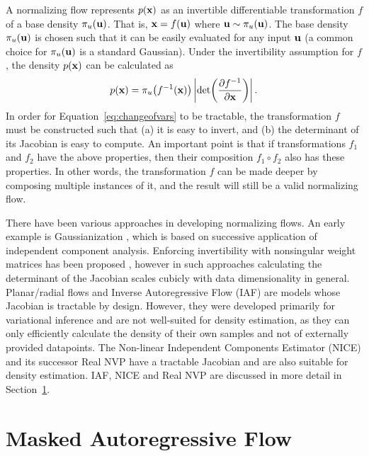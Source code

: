 A normalizing flow \citep{Rezende:2015} represents $p\mathopen{}\left(\mathbf{x}\right)\mathclose{}$ as an invertible differentiable transformation $f$ of a base density $\pi_u\mathopen{}\left(\mathbf{u}\right)\mathclose{}$. That is, 
$\mathbf{x} = f\mathopen{}\left(\mathbf{u}\right)\mathclose{}$ where $\mathbf{u}\sim\pi_u\mathopen{}\left(\mathbf{u}\right)\mathclose{}$.
The base density $\pi_u\mathopen{}\left(\mathbf{u}\right)\mathclose{}$ is chosen such that it can be easily evaluated for any input $\mathbf{u}$ (a common choice for $\pi_u\mathopen{}\left(\mathbf{u}\right)\mathclose{}$ is a standard Gaussian). Under the invertibility assumption for $f$, the density $p\mathopen{}\left(\mathbf{x}\right)\mathclose{}$  can be calculated as
\begin{equation}
\label{eq:changeofvars}
p\mathopen{}\left(\mathbf{x}\right)\mathclose{} = \pi_u\mathopen{}\left(f^{-1}\mathopen{}\left(\mathbf{x}\right)\mathclose{}\right)\mathclose{}\left|\det\mathopen{}\left(\frac{\partial{f^{-1}}}{\partial{\mathbf{x}}}\right)\mathclose{}\right|.
\end{equation}
In order for Equation~\eqref{eq:changeofvars} to be tractable, the transformation $f$ must be constructed such that (a) it is easy to invert, and (b) the determinant of its Jacobian is easy to compute. An important point is that if transformations $f_1$ and $f_2$ have the above properties, then their composition $f_1\circ f_2$ also has these properties. In other words, the transformation $f$ can be made deeper by composing multiple instances of it, and the result will still be a valid normalizing flow.

There have been various approaches in developing normalizing flows. An early example is Gaussianization \citep{Chen:2000}, which is based on successive application of independent component analysis. Enforcing invertibility with nonsingular weight matrices has been proposed \citep{Rippel:2013, Balle:2016}, however in such approaches calculating the determinant of the Jacobian scales cubicly with data dimensionality in general. Planar/radial flows \citep{Rezende:2015} and Inverse Autoregressive Flow (IAF) \citep{Kingma:2016} are models whose Jacobian is tractable by design. However, they were developed primarily for variational inference and are not well-suited for density estimation, as they can only efficiently calculate the density of their own samples and not of externally provided datapoints. The Non-linear Independent Components Estimator (NICE) \citep{Dinh:2014} and its successor Real NVP \citep{Dinh:2017} have a tractable Jacobian and are also suitable for density estimation. IAF, NICE and Real NVP are discussed in more detail in Section~\ref{sec:maf}.


\section{Masked Autoregressive Flow}
\label{sec:maf}

